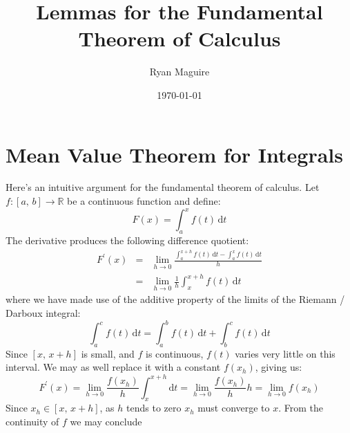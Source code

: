 \documentclass{article}
\title{Lemmas for the Fundamental Theorem of Calculus}
\author{Ryan Maguire}
\date{\today}
\begin{document}
    \maketitle
    \section{Mean Value Theorem for Integrals}
        Here's an intuitive argument for the fundamental theorem of
        calculus. Let $f:[a,\,b]\rightarrow\mathbb{R}$ be a continuous
        function and define:
        \begin{equation}
            F(x)=
            \int_{a}^{x}f(t)\,\textrm{d}t
        \end{equation}
        The derivative produces the following difference quotient:
        \begin{equation}
            \begin{array}{rcl}
                \displaystyle
                F^{\prime}(x)
                &=&
                \displaystyle
                \lim_{h\rightarrow{0}}
                \frac{
                    \displaystyle
                    \int_{a}^{x+h}f(t)\,\textrm{d}t-
                    \int_{a}^{x}f(t)\,\textrm{d}t
                }{h}\\[2em]
                &=&
                \displaystyle
                \lim_{h\rightarrow{0}}
                \frac{1}{h}
                \int_{x}^{x+h}f(t)\,\textrm{d}t
            \end{array}
        \end{equation}
        where we have made use of the additive property of the
        limits of the Riemann / Darboux integral:
        \begin{equation}
            \int_{a}^{c}f(t)\,\textrm{d}t
            =\int_{a}^{b}f(t)\,\textrm{d}t+\int_{b}^{c}f(t)\,\textrm{d}t
        \end{equation}
        Since $[x,\,x+h]$ is small, and $f$ is continuous, $f(t)$ varies
        very little on this interval. We may as well replace it
        with a constant $f(x_{h})$, giving us:
        \begin{equation}
            F^{\prime}(x)
            =\lim_{h\rightarrow{0}}\frac{f(x_{h})}{h}
                \int_{x}^{x+h}\textrm{d}t
            =\lim_{h\rightarrow{0}}\frac{f(x_{h})}{h}h
            =\lim_{h\rightarrow{0}}f(x_{h})
        \end{equation}
        Since $x_{h}\in[x,\,x+h]$, as $h$ tends to zero $x_{h}$ must
        converge to $x$. From the continuity of $f$ we may conclude
\end{document}
